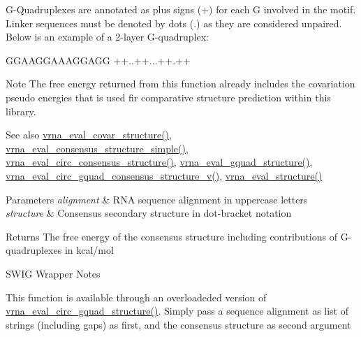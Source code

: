 G-\/\+Quadruplexes are annotated as plus signs (\textquotesingle{}+\textquotesingle{}) for each G involved in the motif. Linker sequences must be denoted by dots (\textquotesingle{}.\textquotesingle{}) as they are considered unpaired. Below is an example of a 2-\/layer G-\/quadruplex\+: 
\begin{DoxyCode}
GGAAGGAAAGGAGG
++..++...++.++
\end{DoxyCode}


\begin{DoxyNote}{Note}
The free energy returned from this function already includes the covariation pseudo energies that is used fir comparative structure prediction within this library.
\end{DoxyNote}
\begin{DoxySeeAlso}{See also}
\mbox{\hyperlink{group__eval_ga6cea75c0eb9857fb59172be54cab09e0}{vrna\+\_\+eval\+\_\+covar\+\_\+structure()}}, \mbox{\hyperlink{group__eval_ga7762c3a7bdcbc3a14ef93259d322c7d6}{vrna\+\_\+eval\+\_\+consensus\+\_\+structure\+\_\+simple()}}, \mbox{\hyperlink{group__eval_gac96577cf232c71160f762737a994b7c6}{vrna\+\_\+eval\+\_\+circ\+\_\+consensus\+\_\+structure()}}, \mbox{\hyperlink{group__eval_ga3263504825ef4b523eba797c99921df4}{vrna\+\_\+eval\+\_\+gquad\+\_\+structure()}}, \mbox{\hyperlink{group__eval_gaecd3e17292a0b3927277434019a5e187}{vrna\+\_\+eval\+\_\+circ\+\_\+gquad\+\_\+consensus\+\_\+structure\+\_\+v()}}, \mbox{\hyperlink{group__eval_ga58f199f1438d794a265f3b27fc8ea631}{vrna\+\_\+eval\+\_\+structure()}}
\end{DoxySeeAlso}

\begin{DoxyParams}{Parameters}
{\em alignment} & R\+NA sequence alignment in uppercase letters \\
\hline
{\em structure} & Consensus secondary structure in dot-\/bracket notation \\
\hline
\end{DoxyParams}
\begin{DoxyReturn}{Returns}
The free energy of the consensus structure including contributions of G-\/quadruplexes in kcal/mol
\end{DoxyReturn}
\begin{DoxyRefDesc}{S\+W\+I\+G Wrapper Notes}
\item[\mbox{\hyperlink{wrappers__wrappers000042}{S\+W\+I\+G Wrapper Notes}}]This function is available through an overloadeded version of \mbox{\hyperlink{group__eval_ga9dba2fc5d7e6ad1359a7c2f350589c0e}{vrna\+\_\+eval\+\_\+circ\+\_\+gquad\+\_\+structure()}}. Simply pass a sequence alignment as list of strings (including gaps) as first, and the consensus structure as second argument \end{DoxyRefDesc}
\mbox{\label{group__eval_ga1c07851f6b665c3461a19e9e4eb33d26}} 

